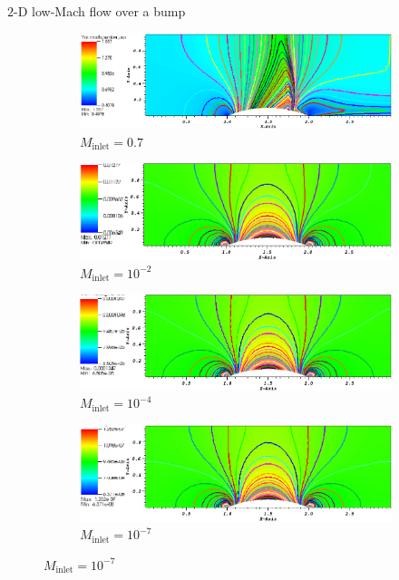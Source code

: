 \documentclass[xcolor=dvipsnames,10pt]{beamer}
\begin{document}
\begin{frame}{$2$-D low-Mach flow over a bump}
\begin{figure}
        \begin{subfigure}[b]{0.5\textwidth}
                \centering
                \includegraphics[width=\textwidth]{../figures/Hump2D_mach_0p7.png}
                \caption{$M_{\text{inlet}}=0.7$}
        \end{subfigure}%
        \begin{subfigure}[b]{0.5\textwidth}
                \centering
                \includegraphics[width=\textwidth]{../figures/Hump2D_mach_0p01.png}
                \caption{$M_{\text{inlet}}=10^{-2}$}
        \end{subfigure}    
  
        \begin{subfigure}[b]{0.5\textwidth}
                \centering
                \includegraphics[width=\textwidth]{../figures/Hump2D_mach_1em4.png}
                \caption{$M_{\text{inlet}}=10^{-4}$}
        \end{subfigure}%
        \begin{subfigure}[b]{0.5\textwidth}
                \centering
                \includegraphics[width=\textwidth]{../figures/Hump2D_mach_1em7.png}
                \caption{$M_{\text{inlet}}=10^{-7}$}
        \end{subfigure}    
\end{figure}
\end{frame}
\end{document}
